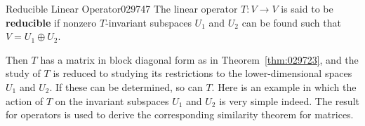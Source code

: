 \begin{definition}{Reducible Linear Operator}{029747}
The linear operator $T : V \to V$ is said to be \textbf{reducible} if nonzero $T$-invariant subspaces $U_{1}$ and $U_{2}$ can be found such that $V = U_{1} \oplus U_{2}$.
\end{definition}

Then $T$ has a matrix in block diagonal form as in Theorem~\ref{thm:029723}, and the study of $T$ is reduced to studying its restrictions to the lower-dimensional spaces $U_{1}$ and $U_{2}$. If these can be determined, so can $T$. Here is an example in which the action of $T$ on the invariant subspaces $U_{1}$ and $U_{2}$ is very simple indeed. The result for operators is used to derive the corresponding similarity theorem for matrices.



